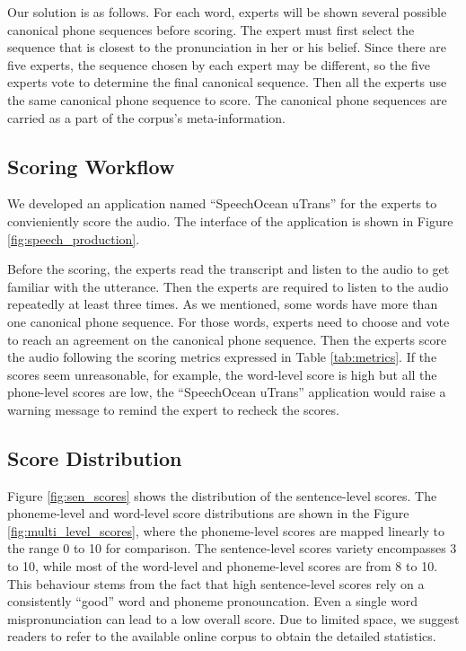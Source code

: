 \documentclass[a4paper]{article}
\begin{document}
Our solution is as follows. For each word, experts will be shown several possible canonical phone sequences before scoring. The expert must first select the sequence that is closest to the pronunciation in her or his belief. Since there are five experts, the sequence chosen by each expert may be different, so the five experts vote to determine the final canonical sequence. Then all the experts use the same canonical phone sequence to score. The canonical phone sequences are carried as a part of the corpus's meta-information.

\subsection{Scoring Workflow}

We developed an application named ``SpeechOcean uTrans'' for the experts to convieniently score the audio. The interface of the application is shown in Figure \ref{fig:speech_production}.

 Before the scoring, the experts read the transcript and listen to the audio to get familiar with the utterance. Then the experts are required to listen to the audio repeatedly at least three times. As we mentioned, some words have more than one canonical phone sequence. For those words, experts need to choose and vote to reach an agreement on the canonical phone sequence. Then the experts score the audio following the scoring metrics expressed in Table \ref{tab:metrics}. If the scores seem unreasonable, for example, the word-level score is high but all the phone-level scores are low, the ``SpeechOcean uTrans'' application would raise a warning message to remind the expert to recheck the scores.

\subsection{Score Distribution}
\label{sec:stat}
Figure \ref{fig:sen_scores} shows the distribution of the sentence-level scores. 
The phoneme-level and word-level score distributions are shown in the Figure \ref{fig:multi_level_scores}, where the phoneme-level scores are mapped linearly to the range 0 to 10 for comparison.
The sentence-level scores variety encompasses 3 to 10, while most of the word-level and phoneme-level scores are from 8 to 10.
This behaviour stems from the fact that high sentence-level scores rely on a consistently ``good'' word and phoneme pronouncation.
Even a single word mispronunciation can lead to a low overall score.
Due to limited space, we suggest readers to refer to the available online corpus to obtain the detailed statistics.
\end{document}
